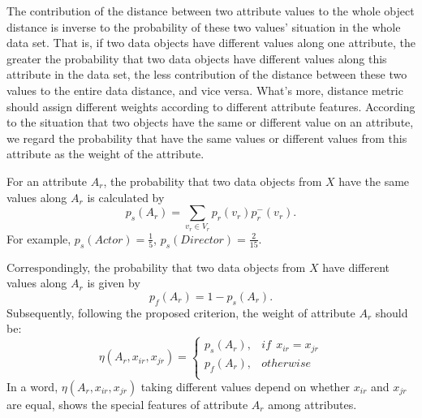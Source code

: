 \documentclass[review]{elsarticle}
\begin{document}
The contribution of the distance between two attribute values to the whole object distance is inverse to the probability of these two values' situation in the whole data set. That is, if two data objects have different values along one attribute, the greater the probability that two data objects have different values along this attribute in the data set, the less contribution of the distance between these two values to the entire data distance, and vice versa. What's more, distance metric should assign different weights according to different attribute features. According to the situation that two objects have the same or different value on an attribute, we regard the probability that have the same values or different values from this attribute as the weight of the attribute.

For an attribute $A_r$, the probability that two data objects from $X$ have the same values along $A_r$ is calculated by
\begin{equation}
p_s(A_r) = \sum_{v_{r} \in V_r}p_r(v_{r})p_r^-(v_{r}).
\label{equ5}
\end{equation}
For example, $p_s(Actor) = \frac{1}{5}$, $p_s(Director) = \frac{2}{15}$.

Correspondingly, the probability that two data objects from $X$ have different values along $A_r$ is given by
\begin{equation}
p_f(A_r) = 1 - p_s(A_r).
\label{equ6}
\end{equation}
Subsequently, following the proposed criterion, the weight of attribute $A_r$ should be:
\begin{equation}
\label{equ7}
\eta(A_r,x_{ir},x_{jr})=
\left\{\begin{array}{cc}
  p_s(A_r), & if\ \ x_{ir} = x_{jr} \\
  p_f(A_r), & otherwise \\
  \end{array} \right.
\end{equation}
In a word, $\eta(A_r,x_{ir},x_{jr})$ taking different values depend on whether $x_{ir}$ and $x_{jr}$ are equal, shows the special features of attribute $A_r$ among attributes.
\end{document}
